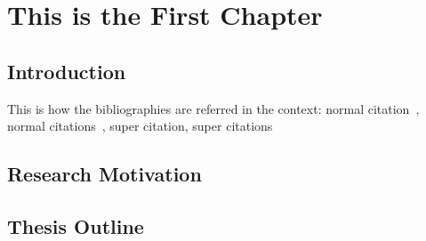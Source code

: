\documentclass[../ThesisMain]{subfiles}
\begin{document}
\doublespacing%
\chapter{This is the First Chapter}\label{chap:1}%
\section{Introduction}
This is how the bibliographies are referred in the context: normal citation~\cite{IEEEexample:confwithadddays}, normal citations~\cite{IEEEexample:confwithvolume,IEEEexample:presentedatconf,IEEEexample:phdurl}, super citation\supercite{IEEEexample:confwithpaper}, super citations\supercite{IEEEexample:confwithpapertype,IEEEexample:masters,IEEEexample:masterstype}

\section{Research Motivation}
\lipsum[0-1]%

\section{Thesis Outline}
\lipsum[0-1]%
\end{document}
